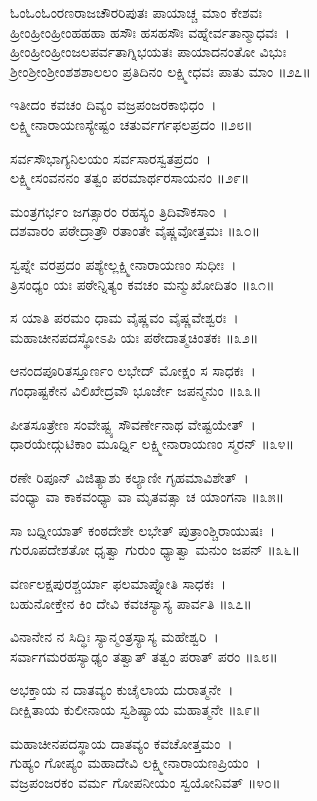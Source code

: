 ಓಂಓಂಓಂರಣರಾಜಚೌರರಿಪುತಃ ಪಾಯಾಚ್ಚ ಮಾಂ ಕೇಶವಃ\\
ಹ್ರೀಂಹ್ರೀಂಹ್ರೀಂಹಹಹಾ ಹಸೌಃ ಹಸಹಸೌಃ ವಹ್ನೇರ್ವತಾನ್ಮಾಧವಃ~।\\
ಹ್ರೀಂಹ್ರೀಂಹ್ರೀಂಜಲಪರ್ವತಾಗ್ನಿಭಯತಃ ಪಾಯಾದನಂತೋ ವಿಭುಃ\\
ಶ್ರೀಂಶ್ರೀಂಶ್ರೀಂಶಶಶಾಲಲಂ ಪ್ರತಿದಿನಂ ಲಕ್ಷ್ಮೀಧವಃ ಪಾತು ಮಾಂ ॥೨೭॥

ಇತೀದಂ ಕವಚಂ ದಿವ್ಯಂ ವಜ್ರಪಂಜರಕಾಭಿಧಂ~।\\
ಲಕ್ಷ್ಮೀನಾರಾಯಣಸ್ಯೇಷ್ಟಂ ಚತುರ್ವರ್ಗಫಲಪ್ರದಂ ॥೨೮॥

ಸರ್ವಸೌಭಾಗ್ಯನಿಲಯಂ ಸರ್ವಸಾರಸ್ವತಪ್ರದಂ~।\\
ಲಕ್ಷ್ಮೀಸಂವನನಂ ತತ್ವಂ ಪರಮಾರ್ಥರಸಾಯನಂ ॥೨೯॥

ಮಂತ್ರಗರ್ಭಂ ಜಗತ್ಸಾರಂ ರಹಸ್ಯಂ ತ್ರಿದಿವೌಕಸಾಂ~।\\
ದಶವಾರಂ ಪಠೇದ್ರಾತ್ರೌ ರತಾಂತೇ ವೈಷ್ಣವೋತ್ತಮಃ ॥೩೦॥

ಸ್ವಪ್ನೇ ವರಪ್ರದಂ ಪಶ್ಯೇಲ್ಲಕ್ಷ್ಮೀನಾರಾಯಣಂ ಸುಧೀಃ~।\\
ತ್ರಿಸಂಧ್ಯಂ ಯಃ ಪಠೇನ್ನಿತ್ಯಂ ಕವಚಂ ಮನ್ಮುಖೋದಿತಂ ॥೩೧॥

ಸ ಯಾತಿ ಪರಮಂ ಧಾಮ ವೈಷ್ಣವಂ ವೈಷ್ಣವೇಶ್ವರಃ~।\\
ಮಹಾಚೀನಪದಸ್ಥೋಽಪಿ ಯಃ ಪಠೇದಾತ್ಮಚಿಂತಕಃ ॥೩೨॥

ಆನಂದಪೂರಿತಸ್ತೂರ್ಣಂ ಲಭೇದ್ ಮೋಕ್ಷಂ ಸ ಸಾಧಕಃ~।\\
ಗಂಧಾಷ್ಟಕೇನ ವಿಲಿಖೇದ್ರವೌ ಭೂರ್ಜೇ ಜಪನ್ಮನುಂ ॥೩೩॥

ಪೀತಸೂತ್ರೇಣ ಸಂವೇಷ್ಟ್ಯ ಸೌವರ್ಣೇನಾಥ ವೇಷ್ಟಯೇತ್~।\\
ಧಾರಯೇದ್ಗುಟಿಕಾಂ ಮೂರ್ಧ್ನಿ ಲಕ್ಷ್ಮೀನಾರಾಯಣಂ ಸ್ಮರನ್ ॥೩೪॥

ರಣೇ ರಿಪೂನ್ ವಿಜಿತ್ಯಾಶು ಕಲ್ಯಾಣೀ ಗೃಹಮಾವಿಶೇತ್~।\\
ವಂಧ್ಯಾ ವಾ ಕಾಕವಂಧ್ಯಾ ವಾ ಮೃತವತ್ಸಾ ಚ ಯಾಂಗನಾ ॥೩೫॥

ಸಾ ಬಧ್ನೀಯಾತ್ ಕಂಠದೇಶೇ ಲಭೇತ್ ಪುತ್ರಾಂಶ್ಚಿರಾಯುಷಃ~।\\
ಗುರೂಪದೇಶತೋ ಧೃತ್ವಾ ಗುರುಂ ಧ್ಯಾತ್ವಾ ಮನುಂ ಜಪನ್ ॥೩೬॥

ವರ್ಣಲಕ್ಷಪುರಶ್ಚರ್ಯಾ ಫಲಮಾಪ್ನೋತಿ ಸಾಧಕಃ~।\\
ಬಹುನೋಕ್ತೇನ ಕಿಂ ದೇವಿ ಕವಚಸ್ಯಾಸ್ಯ ಪಾರ್ವತಿ ॥೩೭॥

ವಿನಾನೇನ ನ ಸಿದ್ಧಿಃ ಸ್ಯಾನ್ಮಂತ್ರಸ್ಯಾಸ್ಯ ಮಹೇಶ್ವರಿ~।\\
ಸರ್ವಾಗಮರಹಸ್ಯಾಢ್ಯಂ ತತ್ವಾತ್ ತತ್ವಂ ಪರಾತ್ ಪರಂ ॥೩೮॥

ಅಭಕ್ತಾಯ ನ ದಾತವ್ಯಂ ಕುಚೈಲಾಯ ದುರಾತ್ಮನೇ~।\\
ದೀಕ್ಷಿತಾಯ ಕುಲೀನಾಯ ಸ್ವಶಿಷ್ಯಾಯ ಮಹಾತ್ಮನೇ ॥೩೯॥

ಮಹಾಚೀನಪದಸ್ಥಾಯ ದಾತವ್ಯಂ ಕವಚೋತ್ತಮಂ~।\\
ಗುಹ್ಯಂ ಗೋಪ್ಯಂ ಮಹಾದೇವಿ ಲಕ್ಷ್ಮೀನಾರಾಯಣಪ್ರಿಯಂ~।\\
ವಜ್ರಪಂಜರಕಂ ವರ್ಮ ಗೋಪನೀಯಂ ಸ್ವಯೋನಿವತ್ ॥೪೦॥

